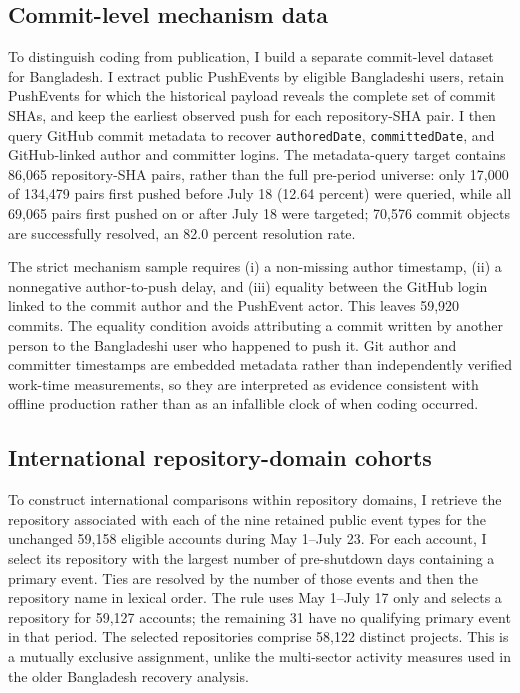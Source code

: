 \subsection{Commit-level mechanism data}
\label{sec:mechanism_data}

To distinguish coding from publication, I build a separate commit-level dataset for Bangladesh. I extract public PushEvents by eligible Bangladeshi users, retain PushEvents for which the historical payload reveals the complete set of commit SHAs, and keep the earliest observed push for each repository-SHA pair. I then query GitHub commit metadata to recover \texttt{authoredDate}, \texttt{committedDate}, and GitHub-linked author and committer logins. The metadata-query target contains 86,065 repository-SHA pairs, rather than the full pre-period universe: only 17,000 of 134,479 pairs first pushed before July 18 (12.64 percent) were queried, while all 69,065 pairs first pushed on or after July 18 were targeted; 70,576 commit objects are successfully resolved, an 82.0 percent resolution rate.

The strict mechanism sample requires (i) a non-missing author timestamp, (ii) a nonnegative author-to-push delay, and (iii) equality between the GitHub login linked to the commit author and the PushEvent actor. This leaves 59,920 commits. The equality condition avoids attributing a commit written by another person to the Bangladeshi user who happened to push it. Git author and committer timestamps are embedded metadata rather than independently verified work-time measurements, so they are interpreted as evidence consistent with offline production rather than as an infallible clock of when coding occurred.

\subsection{International repository-domain cohorts}
\label{sec:international_sector_data}

To construct international comparisons within repository domains, I retrieve the repository associated with each of the nine retained public event types for the unchanged 59,158 eligible accounts during May 1--July 23. For each account, I select its repository with the largest number of pre-shutdown days containing a primary event. Ties are resolved by the number of those events and then the repository name in lexical order. The rule uses May 1--July 17 only and selects a repository for 59,127 accounts; the remaining 31 have no qualifying primary event in that period. The selected repositories comprise 58,122 distinct projects. This is a mutually exclusive assignment, unlike the multi-sector activity measures used in the older Bangladesh recovery analysis.


